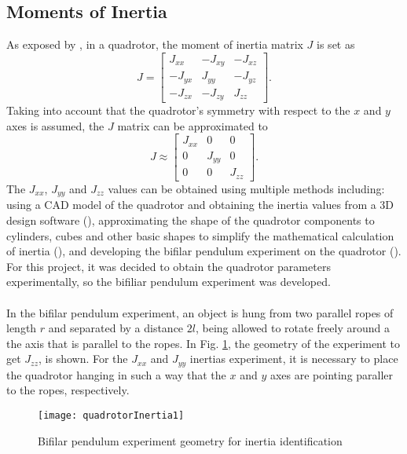 \subsection{Moments of Inertia}
As exposed by \cite{Lee2011}, in a quadrotor, the moment of inertia matrix $J$ is set as
\begin{equation}
J = \begin{bmatrix}
J_{xx} & -J_{xy} & -J_{xz} \\
-J_{yx} & J_{yy} & -J_{yz} \\
-J_{zx} & -J_{zy} & J_{zz}
\end{bmatrix}.
\end{equation}
Taking into account that the quadrotor's symmetry with respect to the $x$ and $y$ axes is assumed, the $J$ matrix can be approximated to
\begin{equation}
J  	\approx  \begin{bmatrix}
J_{xx} & 0 & 0 \\
0 & J_{yy} & 0 \\
0 & 0 & J_{zz}
\end{bmatrix}.
\end{equation}
The $J_{xx}$, $J_{yy}$ and $J_{zz}$ values can be obtained using multiple methods including: using a CAD model of the quadrotor and obtaining the inertia values from a 3D design software (\cite{Khodja2017}), approximating the shape of the quadrotor components to cylinders, cubes and other basic shapes to simplify the mathematical calculation of inertia (\cite{Tomas2011}), and developing the bifilar pendulum experiment on the quadrotor (\cite{Garcia2017}). For this project, it was decided to obtain the quadrotor parameters experimentally, so the bifiliar pendulum experiment was developed.
\\\\
In the bifilar pendulum experiment, an object is hung from two parallel ropes of length $r$ and separated by a distance $2l$, being allowed to rotate freely around a the axis that is parallel to the ropes. In Fig. \ref{fig:bifilar}, the geometry of the experiment to get  $J_{zz}$, is shown. For the $J_{xx}$ and $J_{yy}$ inertias experiment, it is necessary to place the quadrotor hanging in such a way that the $x$ and $y$ axes are pointing paraller to the ropes, respectively.
\begin{figure}[h]
	\begin{center}
		\texttt{[image: quadrotorInertia1]}    
		\caption{Bifilar pendulum experiment geometry for inertia identification} 
		\label{fig:bifilar}
	\end{center}
\end{figure}
